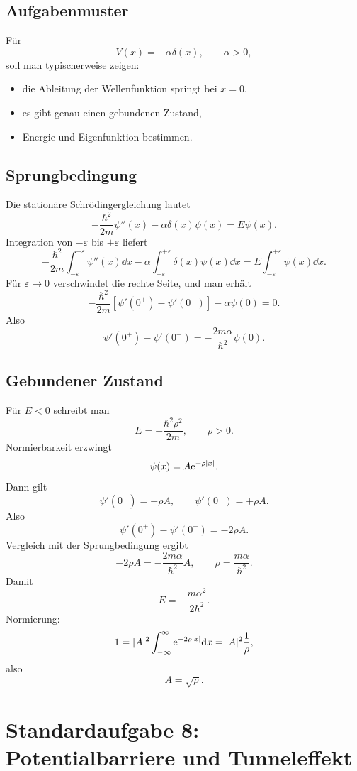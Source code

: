 \subsection{Aufgabenmuster}

Für
\[
    V(x)=-\alpha\delta(x),
    \qquad
    \alpha>0,
\]
soll man typischerweise zeigen:
\begin{itemize}
    \item die Ableitung der Wellenfunktion springt bei $x=0$,
    \item es gibt genau einen gebundenen Zustand,
    \item Energie und Eigenfunktion bestimmen.
\end{itemize}

\subsection{Sprungbedingung}

Die stationäre Schrödingergleichung lautet
\[
    -\frac{\hbar^2}{2m}\psi''(x)-\alpha\delta(x)\psi(x)=E\psi(x).
\]
Integration von $-\varepsilon$ bis $+\varepsilon$ liefert
\[
    -\frac{\hbar^2}{2m}\int_{-\varepsilon}^{+\varepsilon}\psi''(x)\dd x
    -\alpha\int_{-\varepsilon}^{+\varepsilon}\delta(x)\psi(x)\dd x
    =E\int_{-\varepsilon}^{+\varepsilon}\psi(x)\dd x.
\]
Für $\varepsilon\to0$ verschwindet die rechte Seite, und man erhält
\[
    -\frac{\hbar^2}{2m}\left[\psi'(0^+)-\psi'(0^-)\right]-\alpha\psi(0)=0.
\]
Also
\[
    \psi'(0^+)-\psi'(0^-)
    =-\frac{2m\alpha}{\hbar^2}\psi(0).
\]

\subsection{Gebundener Zustand}

Für $E<0$ schreibt man
\[
    E=-\frac{\hbar^2\rho^2}{2m},
    \qquad
    \rho>0.
\]
Normierbarkeit erzwingt
\[
    \psi(x)=A\mathrm{e}^{-\rho|x|}.
\]
Dann gilt
\[
    \psi'(0^+)=-\rho A,
    \qquad
    \psi'(0^-)=+\rho A.
\]
Also
\[
    \psi'(0^+)-\psi'(0^-)=-2\rho A.
\]
Vergleich mit der Sprungbedingung ergibt
\[
    -2\rho A=-\frac{2m\alpha}{\hbar^2}A,
    \qquad
    \rho=\frac{m\alpha}{\hbar^2}.
\]
Damit
\[
    E=-\frac{m\alpha^2}{2\hbar^2}.
\]
Normierung:
\[
    1=|A|^2\int_{-\infty}^{\infty}\mathrm{e}^{-2\rho|x|}\mathrm{d} x
    =|A|^2\frac{1}{\rho},
\]
also
\[
    A=\sqrt\rho.
\]

\section{Standardaufgabe 8: Potentialbarriere und Tunneleffekt}

